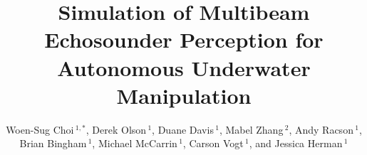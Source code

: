 \documentclass[utf8]{frontiersSCNS} %
\def\firstAuthorLast{Sample {et~al.}} %
\def\Authors{Woen-Sug Choi\,$^{1,*}$, Derek Olson\,$^{1}$, Duane Davis\,$^{1}$, Mabel Zhang\,$^{2}$, Andy Racson\,$^{1}$, Brian Bingham\,$^{1}$, Michael McCarrin\,$^{1}$, Carson Vogt\,$^{1}$, and Jessica Herman\,$^{1}$}
\begin{document}

\title[Running Title]{Simulation of Multibeam Echosounder Perception for Autonomous Underwater Manipulation} 

\author[\firstAuthorLast ]{\Authors} %
\address{} %
\correspondance{} %

\extraAuth{}%

\maketitle
\end{document}
